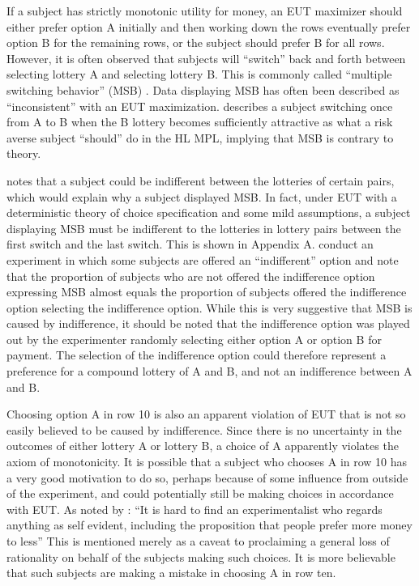 If a subject has strictly monotonic utility for money, an EUT maximizer should either prefer option A initially and then working down the rows eventually prefer option B for the remaining rows, or the subject should prefer B for all rows.
However, it is often observed that subjects will \enquote{switch} back and forth between selecting lottery A and selecting lottery B.
This is commonly called \enquote{multiple switching behavior} (MSB) \parencite{Bruner2011}.
Data displaying MSB has often been described as \enquote{inconsistent} with an EUT maximization.
\textcite[1645]{Holt2002} describes a subject switching once from A to B when the B lottery becomes sufficiently attractive as what a risk averse subject \enquote{should} do in the HL MPL, implying that MSB is contrary to theory.


\textcite[347]{Harrison2007} notes that a subject could be indifferent between the lotteries of certain pairs, which would explain why a subject displayed MSB.
In fact, under EUT with a deterministic theory of choice specification and some mild assumptions, a subject displaying MSB must be indifferent to the lotteries in lottery pairs between the first switch and the last switch.
This is shown in Appendix A.
\textcite{Harrison2007} conduct an experiment in which some subjects are offered an \enquote{indifferent} option and note that the proportion of subjects who are not offered the indifference option expressing MSB almost equals the proportion of subjects offered the indifference option  selecting the indifference option.
While this is very suggestive that MSB is caused by indifference, it should be noted that the indifference option was played out by the experimenter randomly selecting either option A or option B for payment.
The selection of the indifference option could  therefore represent a preference for a compound lottery of A and B, and not an indifference between A and B.


Choosing option A in row 10 is also an apparent violation of EUT that is not so easily believed to be caused by indifference.
Since there is no uncertainty in the outcomes of either lottery A or lottery B, a choice of A apparently violates the axiom of monotonicity.
It is possible that a subject who chooses A in row 10 has a very good motivation to do so, perhaps because of some influence from outside of the experiment, and could potentially still be making choices in accordance with EUT.
As noted by \textcite[930]{Smith1982}: \enquote{It is hard to find an experimentalist who regards anything as self evident, including the proposition that people prefer more money to less}
This is mentioned merely as a caveat to proclaiming a general loss of rationality on behalf of the subjects making such choices. It is more believable that such subjects are making a mistake in choosing A in row ten.

